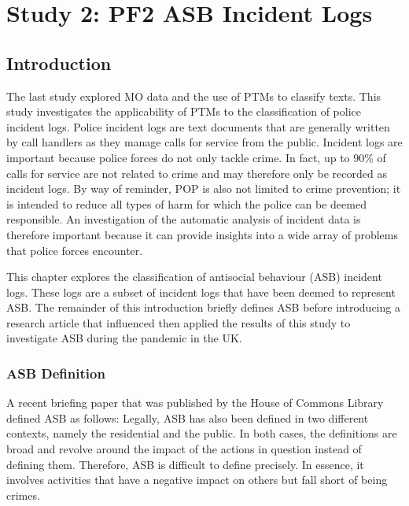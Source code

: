 
\chapter{Study 2: PF2 ASB Incident Logs}


\section{Introduction}

The last study explored MO data and the use of PTMs to classify texts. This study investigates the applicability of PTMs to the classification of police incident logs. Police incident logs are text documents that are generally written by call handlers as they manage calls for service from the public. Incident logs are important because police forces do not only tackle crime. In fact, up to 90\% of calls for service are not related to crime \parencite{demand} and may therefore only be recorded as incident logs. By way of reminder, POP is also not limited to crime prevention; it is intended to reduce all types of harm for which the police can be deemed responsible. An investigation of the automatic analysis of incident data is therefore important because it can provide insights into a wide array of problems that police forces encounter.

This chapter explores the classification of antisocial behaviour (ASB) incident logs. These logs are a subset of incident logs that have been deemed to represent ASB. The remainder of this introduction briefly defines ASB before introducing a research article that influenced then applied the results of this study to investigate ASB during the pandemic in the UK.


\subsection{ASB Definition}
A recent briefing paper that was published by the House of Commons Library   \parencite{brown_sturge_2021} defined ASB as follows:   Legally, ASB has also been defined in two different contexts, namely the residential and the public. In both cases, the definitions are broad and revolve around the impact of the actions in question instead of defining them. Therefore, ASB is difficult to define precisely. In essence, it involves activities that have a negative impact on others but fall short of being crimes.    
 

